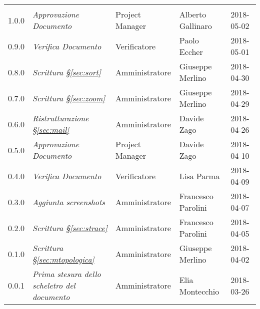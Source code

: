 \newpage 
\section*{}
\begin{table}[H]
	\centering
	\begin{tabular}{C{2cm}|C{4cm}|C{3cm}|C{3cm}|R{2cm}}
		
		 & & & & \\
		
		
		1.0.0  & \emph{Approvazione Documento} & Project Manager & Alberto Gallinaro &  2018-05-02 \\
		\hline
		
		0.9.0  & \emph{Verifica Documento} & Verificatore & Paolo Eccher &  2018-05-01 \\
		\hline
		
		0.8.0  & \emph{Scrittura §\ref{sec:sort}} & Amministratore & Giuseppe Merlino &  2018-04-30 \\
		\hline
		
		0.7.0  & \emph{Scrittura §\ref{sec:zoom}} & Amministratore & Giuseppe Merlino &  2018-04-29 \\
		\hline
		
		0.6.0  & \emph{Ristrutturazione §\ref{sec:mail}} & Amministratore & Davide Zago &  2018-04-26 \\
		\hline
		
		0.5.0  & \emph{Approvazione Documento} & Project Manager & Davide Zago &  2018-04-10 \\
		\hline
		
		0.4.0  & \emph{Verifica Documento} & Verificatore & Lisa Parma &  2018-04-09 \\
		\hline
		
		0.3.0 & \emph{Aggiunta screenshots} & Amministratore & Francesco Parolini &  2018-04-07 \\
		\hline
		
		0.2.0 & \emph{Scrittura §\ref{sec:strace}} & Amministratore & Francesco Parolini &  2018-04-05 \\
		\hline
		
		0.1.0 & \emph{Scrittura §\ref{sec:mtopologica}} & Amministratore & Giuseppe Merlino &  2018-04-02 \\
		\hline
		
		
		0.0.1 & \emph{Prima stesura dello scheletro del documento} & Amministratore & Elia Montecchio &  2018-03-26 \\
		
		
	\end{tabular}
	
\end{table}


\clearpage